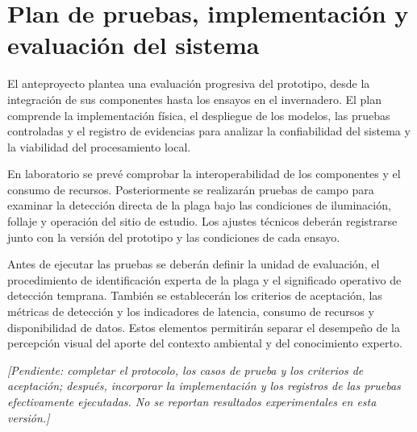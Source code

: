 \chapter{Plan de pruebas, implementación y evaluación del sistema}
\label{cap:pruebas-implementacion-evaluacion}

El anteproyecto plantea una evaluación progresiva del prototipo, desde la
integración de sus componentes hasta los ensayos en el invernadero. El plan
comprende la implementación física, el despliegue de los modelos, las pruebas
controladas y el registro de evidencias para analizar la confiabilidad del sistema
y la viabilidad del procesamiento local.

En laboratorio se prevé comprobar la interoperabilidad de los componentes y el
consumo de recursos. Posteriormente se realizarán pruebas de campo para examinar
la detección directa de la plaga bajo las condiciones de iluminación, follaje y
operación del sitio de estudio. Los ajustes técnicos deberán registrarse junto
con la versión del prototipo y las condiciones de cada ensayo.

Antes de ejecutar las pruebas se deberán definir la unidad de evaluación, el
procedimiento de identificación experta de la plaga y el significado operativo
de detección temprana. También se establecerán los criterios de aceptación, las
métricas de detección y los indicadores de latencia, consumo de recursos y
disponibilidad de datos. Estos elementos permitirán separar el desempeño de la
percepción visual del aporte del contexto ambiental y del conocimiento experto.

\textit{[Pendiente: completar el protocolo, los casos de prueba y los criterios
de aceptación; después, incorporar la implementación y los registros de las
pruebas efectivamente ejecutadas. No se reportan resultados experimentales en
esta versión.]}
